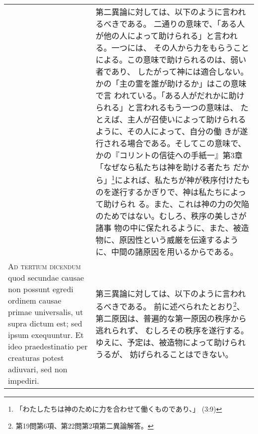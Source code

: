 \documentclass[10pt]{jsarticle} %
\begin{document}
\begin{longtable}{p{21em}p{21em}}
&

第二異論に対しては、以下のように言われるべきである。
二通りの意味で、「ある人が他の人によって助けられる」と言われる。一つには、
 その人から力をもらうことによる。この意味で助けられるのは、弱い者であり、
 したがって神には適合しない。かの「主の霊を誰が助けるか」はこの意味で言
 われている。「ある人がだれかに助けられる」と言われるもう一つの意味は、
たとえば、主人が召使いによって助けられるように、その人によって、自分の働
 きが遂行される場合である。そしてこの意味で、かの『コリントの信徒への手紙一』第3章「なぜなら私たちは神を助ける者たち
 だから」\footnote{「わたしたちは神のために力を合わせて働くものであり、」
 (3:9)}によれば、私たちが神が秩序付けたものを遂行するかぎりで、神は私たちによって助けられ
 る。また、これは神の力の欠陥のためではない。むしろ、秩序の美しさが諸事
 物の中に保たれるように、また、被造物に、原因性という威厳を伝達するよう
 に、中間の諸原因を用いるからである。



\\


{\scshape Ad tertium dicendum} quod secundae causae non
possunt egredi ordinem causae primae universalis, ut supra dictum est;
sed ipsum exequuntur. Et ideo praedestinatio per creaturas potest
adiuvari, sed non impediri.

&


第三異論に対しては、以下のように言われるべきである。
前に述べられたとおり\footnote{第19問第6項、第22問第2項第二異論解答。}、第二原因は、普遍的な第一原因の秩序から逃れられず、
 むしろその秩序を遂行する。ゆえに、予定は、被造物によって助けられうるが、
 妨げられることはできない。

\end{longtable}
\end{document}
